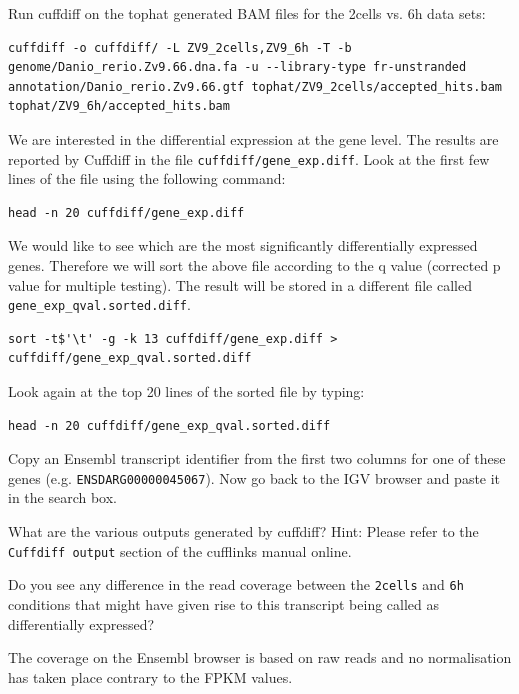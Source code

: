 \begin{bonus}
\begin{steps}
Run cuffdiff on the tophat generated BAM files for the 2cells vs. 6h data sets:
\begin{lstlisting}
cuffdiff -o cuffdiff/ -L ZV9_2cells,ZV9_6h -T -b genome/Danio_rerio.Zv9.66.dna.fa -u --library-type fr-unstranded annotation/Danio_rerio.Zv9.66.gtf tophat/ZV9_2cells/accepted_hits.bam tophat/ZV9_6h/accepted_hits.bam
\end{lstlisting}
\end{steps}

\begin{steps}
We are interested in the differential expression at the gene level. The results
are reported by Cuffdiff in the file \texttt{cuffdiff/gene\_exp.diff}. 
Look at the first few lines of the file using the following command:
\begin{lstlisting}
head -n 20 cuffdiff/gene_exp.diff
\end{lstlisting}

We would like to see which are the most significantly differentially expressed
genes. Therefore we will sort the above file according to the q value
(corrected p value for multiple testing). The result will be stored in a
different file called \texttt{gene\_exp\_qval.sorted.diff}.
\begin{lstlisting}
sort -t$'\t' -g -k 13 cuffdiff/gene_exp.diff > cuffdiff/gene_exp_qval.sorted.diff
\end{lstlisting}

Look again at the top 20 lines of the sorted file by typing:
\begin{lstlisting}
head -n 20 cuffdiff/gene_exp_qval.sorted.diff
\end{lstlisting}
Copy an Ensembl transcript identifier from the first two columns for one of
these genes (e.g. \texttt{ENSDARG00000045067}). Now go back to the IGV browser
and paste it in the search box.
\end{steps}

\begin{questions}
What are the various outputs generated by cuffdiff?
Hint: Please refer to the \texttt{Cuffdiff output} section of the cufflinks manual online.

Do you see any difference in the read coverage between the \texttt{2cells} and
\texttt{6h} conditions that might have given rise to this transcript being
called as differentially expressed?
\begin{warning}
The coverage on the Ensembl browser is based on raw reads and no
normalisation has taken place contrary to the FPKM values.
\end{warning}


\end{questions}
\end{bonus}
